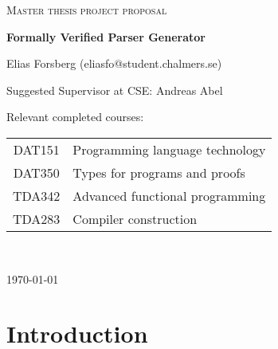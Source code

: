 \documentclass{article}
\begin{document}
\begin{titlepage}


\centering


{\scshape\LARGE Master thesis project proposal\\}

\vspace{0.5cm}

{\huge\bfseries Formally Verified Parser Generator\\}

\vspace{2cm}

{\Large Elias Forsberg (eliasfo@student.chalmers.se)\\}

\vspace{1.0cm}

{\large Suggested Supervisor at CSE: Andreas Abel\\}

\vspace{1.5cm}

{\large Relevant completed courses:\par}

{\itshape %
	\begin{tabular}{cl}
		DAT151 & Programming language technology \\
		DAT350 & Types for programs and proofs \\
		TDA342 & Advanced functional programming \\
		TDA283 & Compiler construction \\
	\end{tabular} \\
}
\vfill

\vfill

{\large \today\\}

\end{titlepage}

\section{Introduction}

\end{document}
